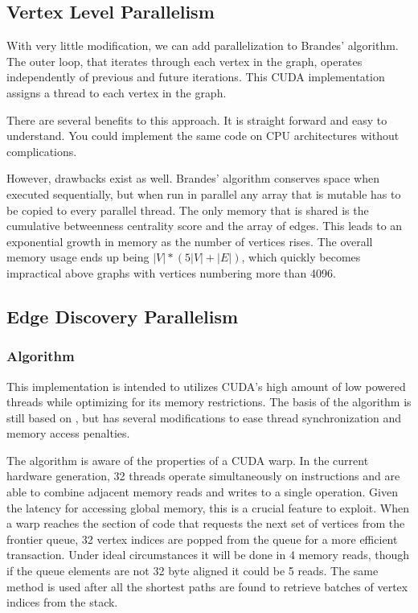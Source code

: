 \documentclass[10pt,twocolumn]{article}
\begin{document}
\subsection{Vertex Level Parallelism}
\label{vertexPar}
With very little modification, we can add parallelization to Brandes' algorithm. The outer loop, that iterates through each vertex in the graph, operates independently of previous and future iterations. This CUDA implementation assigns a thread to each vertex in the graph.
 
There are several benefits to this approach. It is straight forward and easy to understand. You could implement the same code on CPU architectures without complications.
 
However, drawbacks exist as well. Brandes' algorithm conserves space when executed sequentially, but when run in parallel any array that is mutable has to be copied to every parallel thread. The only memory that is shared is the cumulative betweenness centrality score and the array of edges. This leads to an exponential growth in memory as the number of vertices rises. The overall memory usage ends up being $|V| * (5|V| + |E|)$, which quickly becomes impractical above graphs with vertices numbering more than 4096.
 
\subsection{Edge Discovery Parallelism}
\subsubsection{Algorithm}
\label{implBFS}
This implementation is intended to utilizes CUDA's high amount of low powered threads while optimizing for its memory restrictions. The basis of the algorithm is still based on \cite{Brandes01afaster}, but has several modifications to ease thread synchronization and memory access penalties.
 
The algorithm is aware of the properties of a CUDA warp. In the current hardware generation, 32 threads operate simultaneously on instructions and are able to combine adjacent memory reads and writes to a single operation. Given the latency for accessing global memory, this is a crucial feature to exploit. When a warp reaches the section of code that requests the next set of vertices from the frontier queue, 32 vertex indices are popped from the queue for a more efficient transaction. Under ideal circumstances it will be done in 4 memory reads, though if the queue elements are not 32 byte aligned it could be 5 reads. The same method is used after all the shortest paths are found to retrieve batches of vertex indices from the stack.
 
\end{document}
